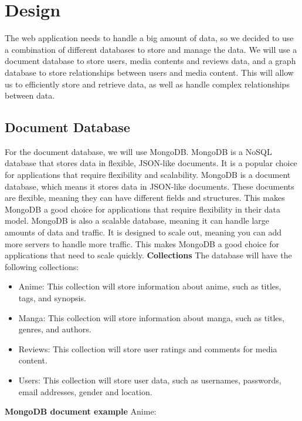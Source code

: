 \chapter{Design}
The web application needs to handle a big amount of data, so we decided to use a combination of different databases to store and manage the data. We will use a document database to store users, media contents and reviews data, and a graph database to store relationships between users and media content. This will allow us to efficiently store and retrieve data, as well as handle complex relationships between data. 

\section{Document Database}
For the document database, we will use MongoDB. MongoDB is a NoSQL database that stores data in flexible, JSON-like documents. It is a popular choice for applications that require flexibility and scalability. MongoDB is a document database, which means it stores data in JSON-like documents. These documents are flexible, meaning they can have different fields and structures. This makes MongoDB a good choice for applications that require flexibility in their data model. MongoDB is also a scalable database, meaning it can handle large amounts of data and traffic. It is designed to scale out, meaning you can add more servers to handle more traffic. This makes MongoDB a good choice for applications that need to scale quickly.
\newline
\newline
\textbf{Collections}
The database will have the following collections:
\begin{itemize}
    \item Anime: This collection will store information about anime, such as titles, tags, and synopsis.
    \item Manga: This collection will store information about manga, such as titles, genres, and authors.
    \item Reviews: This collection will store user ratings and comments for media content.
    \item Users: This collection will store user data, such as usernames, passwords, email addresses, gender and location.

\end{itemize}
\newpage
\textbf{MongoDB document example}
\newline
Anime:
